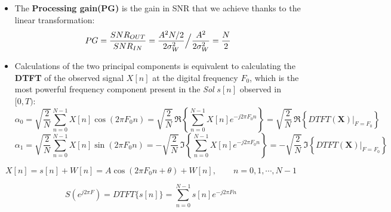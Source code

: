 \begin{itemize}
\[
SNR_{OUT} = \frac{E\left\{ \|\mathbf{s}\|_2^2 \right\}}{E\left\{ \|\mathbf{W}\|_2^2 \right\}}
= \frac{ s_0^2 + s_1^2 }{ E\left\{ W_0^2 + W_1^2 \right\} }
= \frac{A^2 N / 2}{2\sigma_w^2}
= \frac{A^2 N / 2}{2 \cdot N_0 B}
= \frac{A^2 T}{2 N_0}
= \frac{E_s}{N_0}
\]
\item The \textbf{Processing gain(PG)} is the gain in SNR that we achieve thanks to the linear transformation:
\[
PG=\frac{SNR_{OUT}}{SNR_{IN}}=\frac{A^2N/2}{2\sigma^2_W}\Big{/}\frac{A^2}{2\sigma_W^2}=\frac{N}{2}
\]
\newpage
\item Calculations of the two principal components is equivalent to calculating the \textbf{DTFT} of the observed signal \(X[n]\) at the digital frequency \(F_0\), which is the most powerful frequency component present in the \textit{Sol} \(s[n]\) observed in \([0,T)\):
\[
\alpha_0 = \sqrt{\frac{2}{N}} \sum_{n=0}^{N-1} X[n] \cos(2\pi F_0 n)
= \sqrt{\frac{2}{N}}\, \Re \left\{ \sum_{n=0}^{N-1} X[n] e^{-j 2\pi F_0 n} \right\}
= \sqrt{\frac{2}{N}}\, \Re \left\{ DTFT\left( \mathbf{X} \right) \Big|_{F=F_0} \right\}
\]
\[
\alpha_1 = \sqrt{\frac{2}{N}} \sum_{n=0}^{N-1} X[n] \sin(2\pi F_0 n)
= -\sqrt{\frac{2}{N}}\, \Im \left\{ \sum_{n=0}^{N-1} X[n] e^{-j 2\pi F_0 n} \right\}
= -\sqrt{\frac{2}{N}}\, \Im \left\{ DTFT\left( \mathbf{X} \right) \Big|_{F=F_0} \right\}
\]
\end{itemize}
\[
X[n] = s[n] + W[n] = A \cos(2\pi F_0 n + \theta) + W[n], \qquad n = 0, 1, \cdots, N-1
\]

\[
S\left(e^{j 2\pi F}\right) = DTFT\{ s[n] \} = \sum_{n=0}^{N-1} s[n] e^{-j 2\pi F n}
\]


